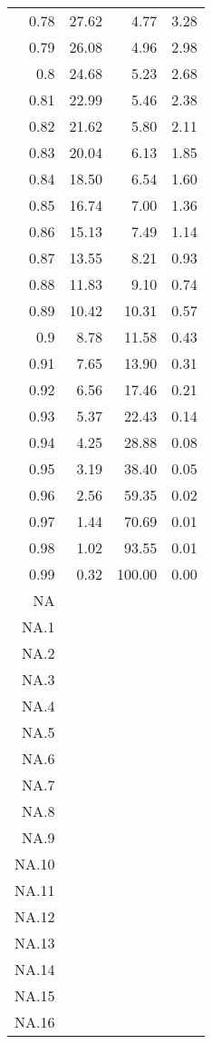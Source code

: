 \begin{table}[ht]
\begin{tabular}{rrrr}
  0.78 & 27.62 & 4.77 & 3.28 \\ 
  0.79 & 26.08 & 4.96 & 2.98 \\ 
  0.8 & 24.68 & 5.23 & 2.68 \\ 
  0.81 & 22.99 & 5.46 & 2.38 \\ 
  0.82 & 21.62 & 5.80 & 2.11 \\ 
  0.83 & 20.04 & 6.13 & 1.85 \\ 
  0.84 & 18.50 & 6.54 & 1.60 \\ 
  0.85 & 16.74 & 7.00 & 1.36 \\ 
  0.86 & 15.13 & 7.49 & 1.14 \\ 
  0.87 & 13.55 & 8.21 & 0.93 \\ 
  0.88 & 11.83 & 9.10 & 0.74 \\ 
  0.89 & 10.42 & 10.31 & 0.57 \\ 
  0.9 & 8.78 & 11.58 & 0.43 \\ 
  0.91 & 7.65 & 13.90 & 0.31 \\ 
  0.92 & 6.56 & 17.46 & 0.21 \\ 
  0.93 & 5.37 & 22.43 & 0.14 \\ 
  0.94 & 4.25 & 28.88 & 0.08 \\ 
  0.95 & 3.19 & 38.40 & 0.05 \\ 
  0.96 & 2.56 & 59.35 & 0.02 \\ 
  0.97 & 1.44 & 70.69 & 0.01 \\ 
  0.98 & 1.02 & 93.55 & 0.01 \\ 
  0.99 & 0.32 & 100.00 & 0.00 \\ 
  NA &  &  &  \\ 
  NA.1 &  &  &  \\ 
  NA.2 &  &  &  \\ 
  NA.3 &  &  &  \\ 
  NA.4 &  &  &  \\ 
  NA.5 &  &  &  \\ 
  NA.6 &  &  &  \\ 
  NA.7 &  &  &  \\ 
  NA.8 &  &  &  \\ 
  NA.9 &  &  &  \\ 
  NA.10 &  &  &  \\ 
  NA.11 &  &  &  \\ 
  NA.12 &  &  &  \\ 
  NA.13 &  &  &  \\ 
  NA.14 &  &  &  \\ 
  NA.15 &  &  &  \\ 
  NA.16 &  &  &  \\ 

\end{tabular}
\end{table}
